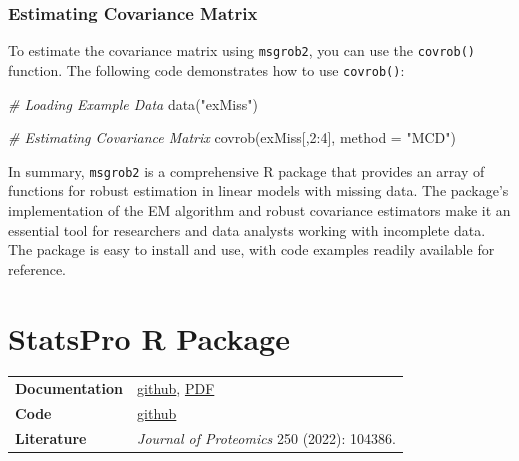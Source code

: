 \documentclass[
]{book}
\newenvironment{Shaded}{\begin{snugshade}}{\end{snugshade}}
\newcommand{\AttributeTok}[1]{\textcolor[rgb]{0.77,0.63,0.00}{#1}}
\newcommand{\CommentTok}[1]{\textcolor[rgb]{0.56,0.35,0.01}{\textit{#1}}}
\newcommand{\DecValTok}[1]{\textcolor[rgb]{0.00,0.00,0.81}{#1}}
\newcommand{\FunctionTok}[1]{\textcolor[rgb]{0.00,0.00,0.00}{#1}}
\newcommand{\NormalTok}[1]{#1}
\newcommand{\SpecialCharTok}[1]{\textcolor[rgb]{0.00,0.00,0.00}{#1}}
\newcommand{\StringTok}[1]{\textcolor[rgb]{0.31,0.60,0.02}{#1}}
\begin{document}
\hypertarget{estimating-covariance-matrix}{%
\subsubsection{Estimating Covariance Matrix}\label{estimating-covariance-matrix}}

To estimate the covariance matrix using \texttt{msgrob2}, you can use the \texttt{covrob()} function. The following code demonstrates how to use \texttt{covrob()}:

\begin{Shaded}
\begin{Highlighting}[]
\CommentTok{\# Loading Example Data}
\FunctionTok{data}\NormalTok{(}\StringTok{"exMiss"}\NormalTok{)}

\CommentTok{\# Estimating Covariance Matrix}
\FunctionTok{covrob}\NormalTok{(exMiss[,}\DecValTok{2}\SpecialCharTok{:}\DecValTok{4}\NormalTok{], }\AttributeTok{method =} \StringTok{"MCD"}\NormalTok{)}
\end{Highlighting}
\end{Shaded}

In summary, \texttt{msgrob2} is a comprehensive R package that provides an array of functions for robust estimation in linear models with missing data. The package's implementation of the EM algorithm and robust covariance estimators make it an essential tool for researchers and data analysts working with incomplete data. The package is easy to install and use, with code examples readily available for reference.

\hypertarget{statspro-r-package}{%
\section{StatsPro R Package}\label{statspro-r-package}}

\begin{longtable}[]{@{}
  >{\raggedright\arraybackslash}p{}
  >{\raggedright\arraybackslash}p{}@{}}
\toprule\noalign{}
\endhead
\bottomrule\noalign{}
\endlastfoot
\textbf{Documentation} & \href{https://github.com/YanglabWCH/StatsPro\#Readme}{github}, \href{https://github.com/YanglabWCH/StatsPro/blob/main/StatsPro_Manual.pdf}{PDF} \\
\textbf{Code} & \href{https://github.com/YanglabWCH/StatsPro}{github} \\
\textbf{Literature} & \emph{Journal of Proteomics} 250 (2022): 104386. \\
\end{longtable}
\end{document}
